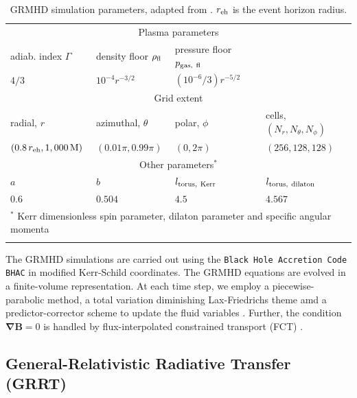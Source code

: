 \documentclass[a4paper,11pt]{article}
\begin{document}
\begin{table}[h!]
	\vspace{-0pt}
	\centering
	\caption{GRMHD simulation parameters, adapted from \cite{Mizuno2018}. $r_{\rm eh}$ is the event horizon radius.}
	\begin{tabular}{llll} 
		\hline \hline
		
		\multicolumn{4}{c}{Plasma parameters}\\
		adiab. index $\Gamma$ & density floor $\rho_{\rm fl}$ & pressure floor $p_{\rm gas,\ fl}$  & \\
		\hline
		$4/3$ & $10^{-4} r^{-3/2}$ &$ (10^{-6}/3) r^{-5/2}$ &\\
		\hline 		
		
		
		\multicolumn{4}{c}{Grid extent}\\
		radial, $r$ & azimuthal, $\theta$ & polar, $\phi$ & cells, $(N_r,N_\theta,N_\phi)$\\
		\hline
		$ \left(0.8\,r_{\rm eh}, 1,000\,{\rm M}\right)$ &$ \left(0.01\pi, 0.99\pi\right)$ &$\left(0, 2\pi\right) $&$\left(256,128,128\right)$ \\
		\hline 
		
		
		\multicolumn{4}{c}{Other parameters$^\ast$}\\
		 $a$ & $b$ & $l_{\rm torus,\ Kerr}$ & $l_{\rm torus,\ dilaton}$ \\
		\hline 
		$0.6$ & $0.504$ & $4.5$ & $4.567$ \\
		\hline 
		
		\multicolumn{4}{l}{$^\ast$ Kerr dimensionless spin parameter, dilaton parameter and specific angular momenta} \\
		\label{tab:grmhd_params}
	\end{tabular} 
\end{table} 
The GRMHD simulations are carried out using the \texttt{Black Hole Accretion Code BHAC} \cite{Porth2017} in modified Kerr-Schild coordinates. The GRMHD equations are evolved in a finite-volume representation. At each time step, we employ a piecewise-parabolic method, a total variation diminishing Lax-Friedrichs theme amd a predictor-corrector scheme to update the fluid variables \cite{Porth2017}. %
Further, the condition $\boldsymbol{\nabla B} =0$ is handled by flux-interpolated constrained transport (FCT) \cite{Porth2017}. 


\subsection{General-Relativistic Radiative Transfer (GRRT)}
\end{document}
